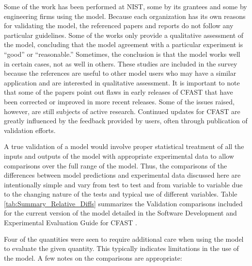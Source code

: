 Some of the work has been  performed at NIST, some by its grantees and some by engineering firms using the model.  Because each organization has its  own reasons for  validating the model, the  referenced papers and reports do not follow any particular guidelines. Some of the works only provide  a qualitative assessment  of the model,  concluding that the  model  agreement with  a  particular  experiment  is ``good''  or ``reasonable.'' Sometimes, the conclusion is that the model works well in certain cases, not as well in others. These studies are included in the survey because the references  are useful to other model users who may have a similar application  and are interested in qualitative assessment. It is important to note  that some of the papers point out flaws in early releases of CFAST that have been corrected or improved in more recent  releases. Some of  the issues raised, however,  are still subjects of  active research. Continued updates for CFAST  are greatly influenced  by   the  feedback   provided  by  users,   often  through publication of validation efforts.


A true validation of a model would involve proper statistical treatment of all the inputs and outputs of the model with appropriate experimental data to allow comparisons over the full range of the model. Thus, the comparisons of the differences between model predictions and experimental data discussed here are intentionally simple and vary from test to test and from variable to variable due to the changing nature of the tests and typical use of different variables. Table \ref{tab:Summary_Relative_Diffs} summarizes the Validation comparisons included for the current version of the model detailed in the Software Development and Experimental Evaluation Guide for CFAST \cite{CFAST_Valid_Guide_6}.

\begin{table}

\label{tab:Summary_Relative_Diffs}


\end{table}

Four of the quantities were seen to require additional care when using the model to evaluate the given quantity.  This typically indicates limitations in the use of the model.  A few notes on the comparisons are appropriate:

